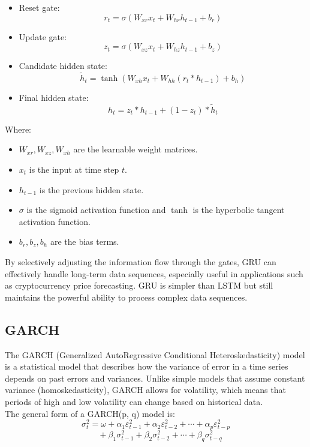 \documentclass{ieeeojies}
\begin{document}
	   \begin{itemize}
    \item Reset gate:
    \begin{equation}
        r_t = \sigma(W_{xr} x_t + W_{hr} h_{t-1} + b_r)
    \end{equation}
    \item Update gate:
    \begin{equation}
        z_t = \sigma(W_{xz} x_t + W_{hz} h_{t-1} + b_z)
    \end{equation}
    \item Candidate hidden state:
    \begin{equation}
        \tilde{h}_t = \tanh(W_{xh} x_t + W_{hh} (r_t * h_{t-1}) + b_h)
    \end{equation}
    \item Final hidden state:
    \begin{equation}
        h_t = z_t * h_{t-1} + (1 - z_t) * \tilde{h}_t
    \end{equation}
        \end{itemize}
	Where:
	\begin{itemize}
		\item $W_{xr}, W_{xz}, W_{xh}$ are the learnable weight matrices.
		\item $x_t$ is the input at time step $t$.
		\item $h_{t-1}$ is the previous hidden state.
		\item $\sigma$ is the sigmoid activation function and $\tanh$ is the hyperbolic tangent activation function.
		\item $b_r, b_z, b_h$ are the bias terms.
	\end{itemize}
	By selectively adjusting the information flow through the gates, GRU can effectively handle long-term data sequences, especially useful in applications such as cryptocurrency price forecasting. GRU is simpler than LSTM but still maintains the powerful ability to process complex data sequences.
\subsection{GARCH}
The GARCH (Generalized AutoRegressive Conditional Heteroskedasticity) model is a statistical model that describes how the variance of error in a time series depends on past errors and variances. Unlike simple models that assume constant variance (homoskedasticity), GARCH allows for volatility, which means that periods of high and low volatility
can change based on historical data.
\\The general form of a GARCH(p, q) model is:
\[
\sigma^2_t = \omega + \alpha_1 \varepsilon^2_{t-1} + \alpha_2 \varepsilon^2_{t-2} + \cdots + \alpha_p \varepsilon^2_{t-p}
\]
\[
\quad + \beta_1 \sigma^2_{t-1} + \beta_2 \sigma^2_{t-2} + \cdots + \beta_q \sigma^2_{t-q}
\]
\end{document}
